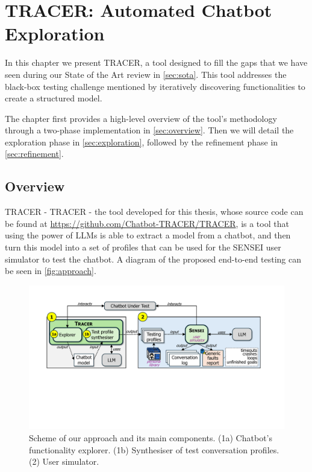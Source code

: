 
\chapter{TRACER: Automated Chatbot Exploration}\label{chapter:tracer}

In this chapter we present \ac{TRACER},
a tool designed to fill the gaps that we have seen
during our State of the Art review in \autoref{sec:sota}.
This tool addresses the black-box testing challenge mentioned
by iteratively discovering functionalities
to create a structured model.

The chapter first provides a high-level overview
of the tool's methodology through a two-phase implementation in \autoref{sec:overview}.
Then we will detail the exploration phase in \autoref{sec:exploration},
followed by the refinement phase in \autoref{sec:refinement}.

\section{Overview}\label{sec:overview}

\ac{TRACER} - \acl{TRACER} - the tool developed for this thesis,
whose source code can be found at \url{https://github.com/Chatbot-TRACER/TRACER},
is a tool that using the power of \acp{LLM}
is able to extract a model from a chatbot,
and then turn this model into a set of profiles
that can be used for the SENSEI
\autocite{delaraSensei, delaraAutomatedEndtoEndTesting2025} user simulator
to test the chatbot.
A diagram of the proposed end-to-end testing
can be seen in \autoref{fig:approach}.


\begin{figure}[!htpb]
  \centering
  \includegraphics[width=\linewidth]{figures/approach.pdf}
  \caption{Scheme of our approach and its main components.
    (1a) Chatbot’s functionality explorer.
    (1b) Synthesiser of test conversation profiles.
    (2) User simulator.}
  \label{fig:approach}
\end{figure}


